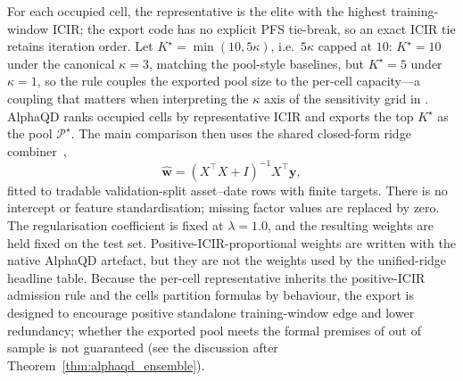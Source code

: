 For each occupied cell, the representative is the elite with the highest training-window ICIR; the export code has no explicit PFS tie-break, so an exact ICIR tie retains iteration order. Let $K^\star=\min(10,5\kappa)$, i.e.\ $5\kappa$ capped at $10$: $K^\star=10$ under the canonical $\kappa=3$, matching the pool-style baselines, but $K^\star=5$ under $\kappa=1$, so the rule couples the exported pool size to the per-cell capacity---a coupling that matters when interpreting the $\kappa$ axis of the sensitivity grid in . AlphaQD ranks occupied cells by representative ICIR and exports the top $K^\star$ as the pool $\mathcal{P}^\star$. The main comparison then uses the shared closed-form ridge combiner~\cite{hoerl1970ridge},
\[
\widehat{\mathbf w}=(X^\top X+I)^{-1}X^\top\mathbf y,
\]
fitted to tradable validation-split asset--date rows with finite targets. There is no intercept or feature standardisation; missing factor values are replaced by zero. The regularisation coefficient is fixed at $\lambda=1.0$, and the resulting weights are held fixed on the test set. Positive-ICIR-proportional weights are written with the native AlphaQD artefact, but they are not the weights used by the unified-ridge headline table. Because the per-cell representative inherits the positive-ICIR admission rule and the cells partition formulas by behaviour, the export is designed to encourage positive standalone training-window edge and lower redundancy; whether the exported pool meets the formal premises of  out of sample is not guaranteed (see the discussion after Theorem~\ref{thm:alphaqd_ensemble}).

